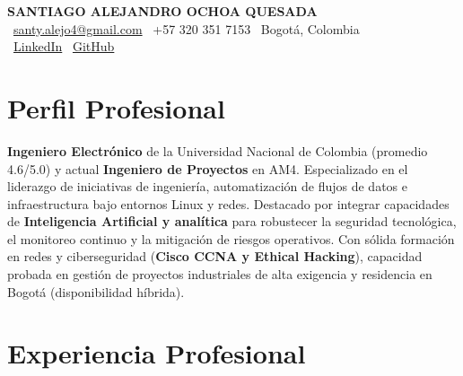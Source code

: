 \documentclass[11pt,a4paper]{article}
\begin{document}
\thispagestyle{empty}
\color{darktext}

\begin{center}
    {\Huge \bfseries\color{accent} SANTIAGO ALEJANDRO OCHOA QUESADA} \\[6pt]
    {\small\color{darktext}
    \faEnvelope\ \href{mailto:santy.alejo4@gmail.com}{santy.alejo4@gmail.com}
    \quad\textcolor{bulletline}{\textbar}\quad
    \faPhone\ +57 320 351 7153
    \quad\textcolor{bulletline}{\textbar}\quad
    \faMapMarker*\ Bogotá, Colombia \\[4pt]
    \faLinkedin\ \href{https://linkedin.com/in/santiago-alejandro-ochoa-quesada-a07a18288/}{LinkedIn}
    \quad\textcolor{bulletline}{\textbar}\quad
    \faGithub\ \href{https://github.com/Sochoaq}{GitHub}
    }
\end{center}
\vspace{4pt}

\section{Perfil Profesional}
\textbf{Ingeniero Electrónico} de la Universidad Nacional de Colombia (promedio 4.6/5.0) y actual \textbf{Ingeniero de Proyectos} en AM4. Especializado en el liderazgo de iniciativas de ingeniería, automatización de flujos de datos e infraestructura bajo entornos Linux y redes. Destacado por integrar capacidades de \textbf{Inteligencia Artificial y analítica} para robustecer la seguridad tecnológica, el monitoreo continuo y la mitigación de riesgos operativos. Con sólida formación en redes y ciberseguridad (\textbf{Cisco CCNA y Ethical Hacking}), capacidad probada en gestión de proyectos industriales de alta exigencia y residencia en Bogotá (disponibilidad híbrida).

\section{Experiencia Profesional}
\end{document}
